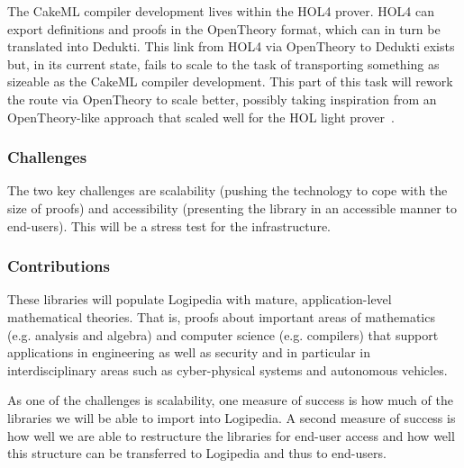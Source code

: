 The CakeML compiler development lives within the HOL4 prover. HOL4 can
export definitions and proofs in the OpenTheory format, which can in
turn be translated into Dedukti. This link from HOL4 via OpenTheory to
Dedukti exists but, in its current state, fails to scale to the task
of transporting something as sizeable as the CakeML compiler
development. This part of this task will rework the route via
OpenTheory to scale better, possibly taking inspiration from an
OpenTheory-like approach that scaled well for the HOL light
prover~\cite{KaliszykK13}.


\subsubsection*{Challenges}

The two key challenges are scalability (pushing the technology to cope
with the size of proofs) and accessibility (presenting the library in
an accessible manner to end-users). This will be a stress test for the
infrastructure.

\subsubsection*{Contributions}

These libraries will populate Logipedia with mature,
application-level mathematical theories. That is, proofs about
important areas of mathematics (e.g. analysis and algebra) and
computer science (e.g. compilers) that support applications in
engineering as well as security and in particular in interdisciplinary
areas such as cyber-physical systems and autonomous vehicles.

As one of the challenges is scalability, one measure of success is how
much of the libraries we will be able to import into Logipedia. A
second measure of success is how well we are able to restructure the
libraries for end-user access and how well this structure can be
transferred to Logipedia and thus to end-users.

